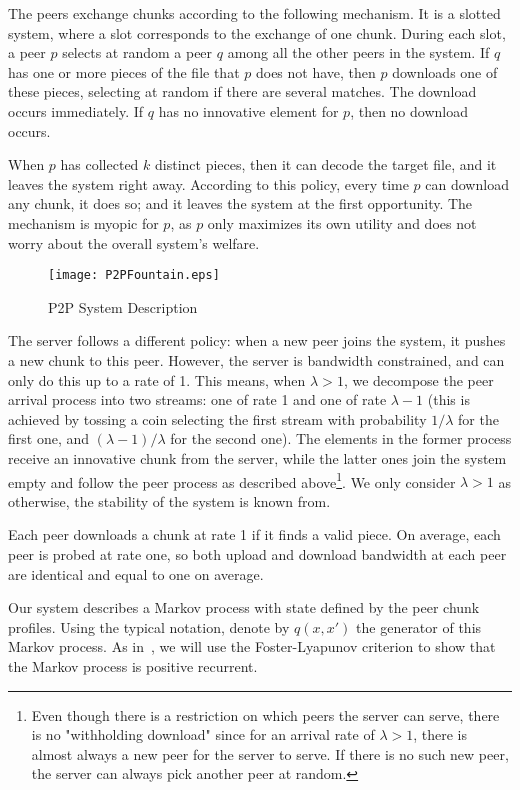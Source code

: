 \documentclass[11pt,conference]{IEEEtran}
\begin{document}
The peers exchange chunks according to the following mechanism. It is a slotted system, where a slot corresponds to the exchange of one chunk. During each slot, a peer $p$ selects at random a peer $q$ among all the other peers in the system. If $q$ has one or more pieces of the file that $p$ does not have, then $p$ downloads one of these pieces, selecting at random if there are several matches. The download occurs immediately. If $q$ has no innovative element for $p$, then no download occurs.

When $p$ has collected $k$ distinct pieces, then it can decode the target file, and it leaves the system right away. According to this policy, every time $p$ can download any chunk, it does so; and it leaves the system at the first opportunity. The mechanism is myopic for $p$, as $p$ only maximizes its own utility and does not worry about the overall system's welfare.

\begin{figure}[!t]
\centering
\texttt{[image: P2PFountain.eps]}
\caption{P2P System Description}
\label{fig:p2pfountain}
\end{figure}

The server follows a different policy: when a new peer joins the system, it pushes a new chunk to this peer. However, the server is bandwidth constrained, and can only do this up to a rate of 1. This means, when $\lambda > 1$, we decompose the peer arrival process into two streams: one of rate 1 and one of rate $\lambda -1$ (this is achieved by tossing a coin selecting the first stream with probability $1/\lambda$ for the first one, and $(\lambda-1)/\lambda$ for the second one). The elements in the former process receive an innovative chunk from the server, while the latter ones join the system empty and follow the peer process as described above\footnote{Even though there is a restriction on which peers the server can serve, there is no "withholding download" since for an arrival rate of $\lambda > 1$, there is almost always a new peer for the server to serve. If there is no such new peer, the server can always pick another peer at random.}. We only consider $\lambda > 1$ as otherwise, the stability of the system is known from\cite{Zhu2011Stability}.

Each peer downloads a chunk at rate 1 if it finds a valid piece. On average, each peer is probed at rate one, so both upload and download bandwidth at each peer are identical and equal to one on average.

Our system describes a Markov process with state defined by the peer chunk profiles. Using the typical notation, denote by $q(x,x')$ the generator of this Markov process. As in~\cite{Zhu2011Stability}\cite{Oguz:EECS-2012-6}, we will use the Foster-Lyapunov criterion to show that the Markov process is positive recurrent.
\end{document}
